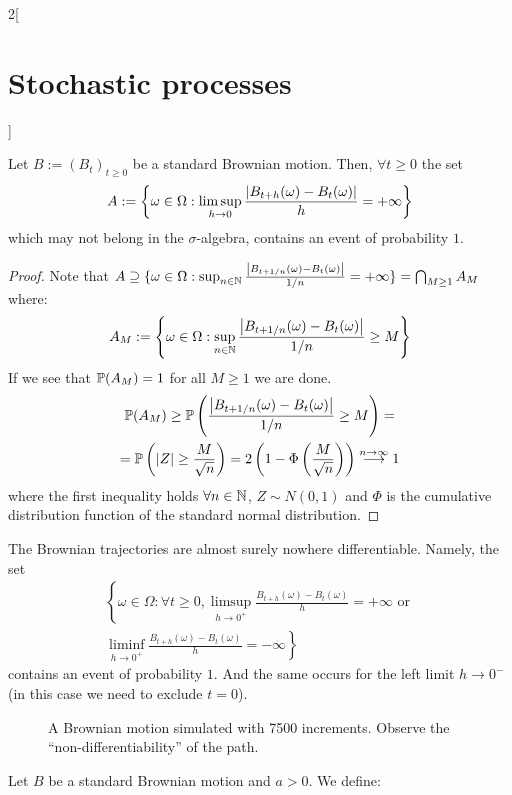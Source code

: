 \documentclass[../../../main_math.tex]{subfiles}
\begin{document}
\begin{multicols}{2}[\section{Stochastic processes}]
\begin{proposition}
    Let $B:= {(B_t)}_{t\geq 0}$ be a standard Brownian motion. Then, $\forall t\geq 0$ the set
    $$
      A:=\left\{\omega\in\Omega:\limsup_{h\to 0}\frac{\abs{B_{t+h}(\omega)-B_t(\omega)}}{h}=+\infty\right\}
    $$
    which may not belong in the $\sigma$-algebra, contains an event of probability $1$.
  \end{proposition}
  \begin{proof}
    Note that $A\supseteq \{\omega\in\Omega:\sup_{n\in\mathbb{N}}\frac{\abs{B_{t+1/n}(\omega)-B_t(\omega)}}{1/n}=+\infty\}=\bigcap_{M\geq 1} A_{M}$ where:
    $$
      A_M:=\left\{\omega\in\Omega:\sup_{n\in\mathbb{N}}\frac{\abs{B_{t+1/n}(\omega)-B_t(\omega)}}{1/n}\geq M\right\}
    $$
    If we see that $\mathbb{P}(A_M)=1$ for all $M\geq 1$ we are done.
    \begin{multline*}
      \mathbb{P}(A_M)\geq \mathbb{P} \left(\frac{\abs{B_{t+1/n}(\omega)-B_t(\omega)}}{1/n}\geq M\right) = \\ = \mathbb{P}\left(\abs{Z}\geq \frac{M}{\sqrt{n}}\right)=2 \left(1-\Phi\left(\frac{M}{\sqrt{n}}\right)\right)\overset{n\to\infty}{\longrightarrow} 1
    \end{multline*}
    where the first inequality holds $\forall n\in\mathbb{N}$, $Z\sim N(0,1)$ and $\Phi$ is the cumulative distribution function of the standard normal distribution.
  \end{proof}
  \begin{theorem}
    The Brownian trajectories are almost surely nowhere differentiable. Namely, the set
    \begin{multline*}
      \left\{
      \omega\in\Omega:\forall t\geq 0, \limsup_{h\to 0^+}\frac{{B_{t+h}(\omega)-B_t(\omega)}}{h}=+\infty\text{ or }\right.\\
      \left.\liminf_{h\to 0^+}\frac{{B_{t+h}(\omega)-B_t(\omega)}}{h}=-\infty
      \right\}
    \end{multline*}
    contains an event of probability $1$. And the same occurs for the left limit $h\to 0^-$ (in this case we need to exclude $t=0$).
  \end{theorem}
  \begin{figure}[H]
    \centering
    
    \caption{A Brownian motion simulated with 7500 increments. Observe the ``non-differentiability'' of the path.}
    \label{fig:BrownianMotion}
  \end{figure}
  \begin{definition}
    Let $B$ be a standard Brownian motion and $a>0$. We define:

\end{definition}
\end{multicols}
\end{document}
